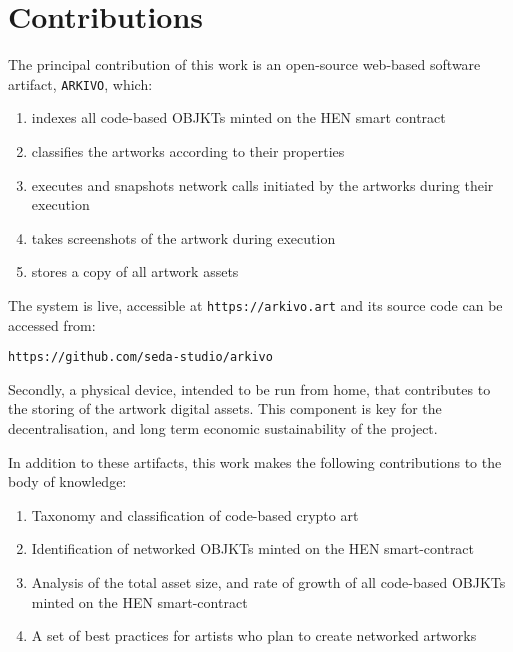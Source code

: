 \section{Contributions}

The principal contribution of this work is an open-source web-based software artifact, \texttt{ARKIVO}, which:

\begin{enumerate}
	\item indexes all code-based OBJKTs minted on the HEN smart contract
	\item classifies the artworks according to their properties
	\item executes and snapshots network calls initiated by the artworks during their execution
	\item takes screenshots of the artwork during execution
	\item stores a copy of all artwork assets
\end{enumerate}

\vspace{0.5cm}

The system is live, accessible at \texttt{https://arkivo.art} and its source code can be accessed from:

\texttt{https://github.com/seda-studio/arkivo}

\vspace{0.5cm}

Secondly, a physical device, intended to be run from home, that contributes to the storing of the artwork digital assets. This component is key for the decentralisation, and long term economic sustainability of the project. 

\vspace{0.5cm}

In addition to these artifacts, this work makes the following contributions to the body of knowledge:

\begin{enumerate}
    \item Taxonomy and classification of code-based crypto art
    \item Identification of networked OBJKTs minted on the HEN smart-contract
    \item Analysis of the total asset size, and rate of growth of all code-based OBJKTs minted on the HEN smart-contract
    \item A set of best practices for artists who plan to create networked artworks
\end{enumerate}


